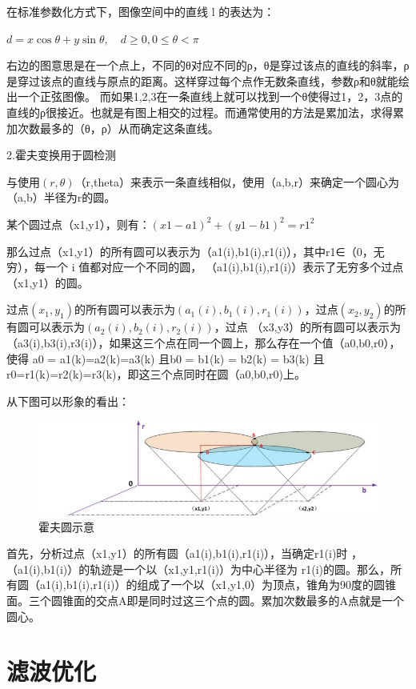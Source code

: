 在标准参数化方式下，图像空间中的直线 l 的表达为：

$d=x \cos \theta+y \sin \theta, \quad d \geqslant 0,0 \leqslant \theta<\pi$

右边的图意思是在一个点上，不同的θ对应不同的ρ，θ是穿过该点的直线的斜率，ρ是穿过该点的直线与原点的距离。这样穿过每个点作无数条直线，参数ρ和θ就能绘出一个正弦图像。 ⽽如果1,2,3在一条直线上就可以找到⼀个θ使得过1，2，3点的直线的ρ很接近。也就是有图上相交的过程。而通常使用的方法是累加法，求得累加次数最多的（θ，ρ）从⽽确定这条直线。

2.霍夫变换用于圆检测

与使用$(r, \theta)$（r,theta）来表示一条直线相似，使用（a,b,r）来确定一个圆心为（a,b）半径为r的圆。

某个圆过点（x1,y1），则有：$(x1-a1)^2 + (y1-b1)^2 = r1^2$

那么过点（x1,y1）的所有圆可以表示为（a1(i),b1(i),r1(i)），其中r1∈（0，无穷），每⼀个 i 值都对应⼀个不同的圆， （a1(i),b1(i),r1(i)）表⽰了无穷多个过点（x1,y1）的圆。

过点$(x_{1}, y_{1})$的所有圆可以表示为$(a_{1}(i), b_{1}(i),r_{1}(i))$，过点$(x_{2}, y_{2})$的所有圆可以表示为$(a_{2}(i),b_{2}(i),r_{2}(i))$，过点 （x3,y3）的所有圆可以表示为（a3(i),b3(i),r3(i)），如果这三个点在同一个圆上，那么存在一个值（a0,b0,r0），使得 a0 = a1(k)=a2(k)=a3(k) 且b0 = b1(k) = b2(k) = b3(k) 且r0=r1(k)=r2(k)=r3(k)，即这三个点同时在圆（a0,b0,r0)上。

从下图可以形象的看出：

\begin{figure}[ht]
  \centering
  \includegraphics[width=0.8\linewidth]{./Figure/Hough_Circle.png}
  \caption{霍夫圆示意}\label{Fig:xd1}
\end{figure}

⾸先，分析过点（x1,y1）的所有圆（a1(i),b1(i),r1(i)），当确定r1(i)时 ，（a1(i),b1(i)）的轨迹是⼀个以（x1,y1,r1(i)）为中心半径为 r1(i)的圆。那么，所有圆（a1(i),b1(i),r1(i)）的组成了一个以（x1,y1,0）为顶点，锥角为90度的圆锥面。三个圆锥面的交点A即是同时过这三个点的圆。累加次数最多的A点就是一个圆⼼。

\section{滤波优化}

